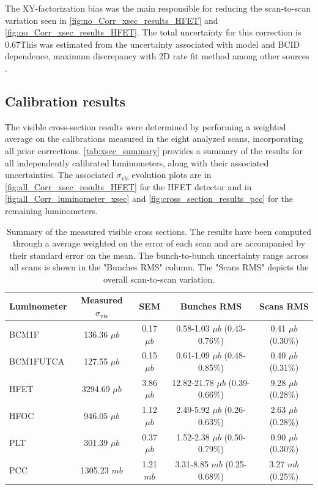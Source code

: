 The XY-factorization bias was the main responsible for reducing the scan-to-scan variation seen in \autoref{fig:no_Corr_xsec_results_HFET} and \autoref{fig:no_Corr_xsec_results_HFET}. The total uncertainty for this correction is 0.67\. This was estimated from the uncertainty associated with model and BCID dependence, maximum discrepancy with 2D rate fit method among other sources \cite{CMS-PAS-LUM-22-001}.

\subsection{Calibration results}

The visible cross-section results were determined by performing a weighted average on the calibrations measured in the eight analyzed scans, incorporating all prior corrections. \autoref{tab:xsec_summary} provides a summary of the results for all independently calibrated luminometers, along with their associated uncertainties. The associated $\sigma_{\mathrm{vis}}$ evolution plots are in \autoref{fig:all_Corr_xsec_results_HFET} for the HFET detector and in \autoref{fig:all_Corr_luminometer_xsec} and \autoref{fig:cross_section_results_pcc} for the remaining luminometers.

\begin{table}[!htb]
	\caption[Summary of visible cross-sections results]{Summary of the measured visible cross sections. The results have been computed through a average weighted on the error of each scan and are accompanied by their standard error on the mean. The bunch-to-bunch uncertainty range across all scans is shown in the "Bunches RMS" column. The "Scans RMS" depicts the overall scan-to-scan variation. }
	
	\label{tab:xsec_summary}
	\centering
	\begin{tabular}{lcccc}
		\hline
		Luminometer & Measured $\sigma_\mathrm{vis}$ & SEM  & Bunches RMS & Scans RMS \\
		\hline
		BCM1F & 136.36 $\mu b$ & 0.17 $\mu b$ & 0.58-1.03 $\mu b$ (0.43-0.76\%) & 0.41 $\mu b$ (0.30\%) \\
		BCM1FUTCA & 127.55 $\mu b$ & 0.15 $\mu b$ & 0.61-1.09 $\mu b$ (0.48-0.85\%) & 0.40 $\mu b$ (0.31\%) \\
		HFET & 3294.69 $\mu b$ & 3.86 $\mu b$ & 12.82-21.78 $\mu b$ (0.39-0.66\%) & 9.28 $\mu b$ (0.28\%) \\
		HFOC & 946.05 $\mu b$ & 1.12 $\mu b$ & 2.49-5.92 $\mu b$ (0.26-0.63\%) & 2.63 $\mu b$ (0.28\%) \\
		PLT & 301.39 $\mu b$ & 0.37 $\mu b$ & 1.52-2.38 $\mu b$ (0.50-0.79\%) & 0.90 $\mu b$ (0.30\%) \\
		PCC & 1305.23 $mb$ & 1.21 $mb$ & 3.31-8.85 $mb$ (0.25-0.68\%) & 3.27 $mb$ (0.25\%) \\
		\hline
	\end{tabular}
\end{table}

